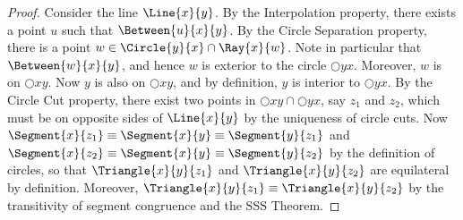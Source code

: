\documentclass{article}
\begin{document}
\begin{proof}
Consider the line $\Line{x}{y}$. By the Interpolation property, there exists a point $u$ such that $\Between{u}{x}{y}$. By the Circle Separation property, there is a point $w \in \Circle{y}{x} \cap \Ray{x}{w}$. Note in particular that $\Between{w}{x}{y}$, and hence $w$ is exterior to the circle $\Circle{y}{x}$. Moreover, $w$ is on $\Circle{x}{y}$. Now $y$ is also on $\Circle{x}{y}$, and by definition, $y$ is interior to $\Circle{y}{x}$. By the Circle Cut property, there exist two points in $\Circle{x}{y} \cap \Circle{y}{x}$, say $z_1$ and $z_2$, which must be on opposite sides of $\Line{x}{y}$ by the uniqueness of circle cuts. Now $\Segment{x}{z_1} \equiv \Segment{x}{y} \equiv \Segment{y}{z_1}$ and $\Segment{x}{z_2} \equiv \Segment{x}{y} \equiv \Segment{y}{z_2}$ by the definition of circles, so that $\Triangle{x}{y}{z_1}$ and $\Triangle{x}{y}{z_2}$ are equilateral by definition. Moreover, $\Triangle{x}{y}{z_1} \equiv \Triangle{x}{y}{z_2}$ by the transitivity of segment congruence and the SSS Theorem.
\end{proof}
\end{document}
